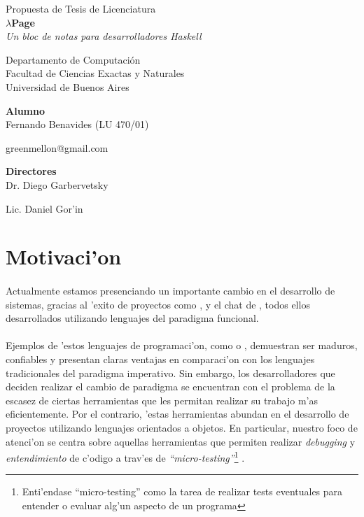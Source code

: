 \documentclass[a4paper]{article}
\begin{document}
	\thispagestyle{empty}
	\begin{center}
	{\Large Propuesta de Tesis de Licenciatura}\\[1em]
	{\huge \textbf{$\lambda$Page}}\\[0.5em]
	{\large \textit{Un bloc de notas para desarrolladores Haskell}}\\[1em]
	\par{}
	{\large Departamento de Computaci\'on}\\[0.5em]
	{\large Facultad de Ciencias Exactas y Naturales}\\[0.5em]
	{\large Universidad de Buenos Aires}
	\par{}
	{\Large \textbf{Alumno}}\\[0.8em]
	{\Large Fernando Benavides (LU 470/01)} \par
	{\Large greenmellon@gmail.com} \par
	\par{}
	{\Large \textbf{Directores}}\\[0.8em]
	{\Large Dr. Diego Garbervetsky} \par
	{\Large Lic. Daniel Gor'in}
	\end{center}

\section{Motivaci'on}

\paragraph{}Actualmente estamos presenciando un importante cambio en el desarrollo de sistemas, gracias al 'exito de proyectos como ,  y el chat de , todos ellos desarrollados utilizando lenguajes del paradigma funcional.
\paragraph{}Ejemplos de 'estos lenguajes de programaci'on, como  o , demuestran ser maduros, confiables y presentan claras ventajas en comparaci'on con los lenguajes tradicionales del paradigma imperativo.  Sin embargo, los desarrolladores que deciden realizar el cambio de paradigma se encuentran con el problema de la escasez de ciertas herramientas que les permitan realizar su trabajo m'as eficientemente.  Por el contrario, 'estas herramientas abundan en el desarrollo de proyectos utilizando lenguajes orientados a objetos.  En particular, nuestro foco de atenci'on se centra sobre aquellas herramientas que permiten realizar \textsl{debugging} y \textsl{entendimiento} de c'odigo a trav'es de \textsl{``micro-testing''}\footnote{Enti'endase ``micro-testing'' como la tarea de realizar tests eventuales para entender o evaluar alg'un aspecto de un programa} .
\end{document}
